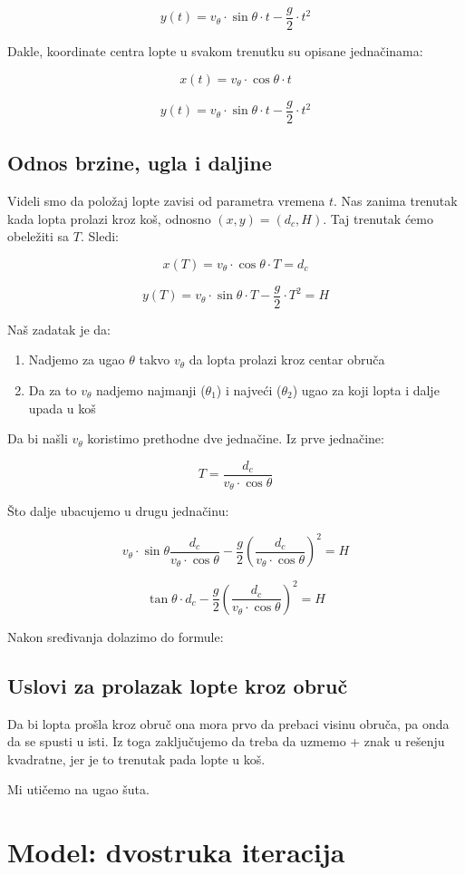 \documentclass[a4paper, 12pt]{article}
\begin{document}
\[y(t) = v_{\theta} \cdot \sin \theta\cdot t - \dfrac{g}{2} \cdot t^2\]

Dakle, koordinate centra lopte u svakom trenutku su opisane jednačinama:

\[x(t) = v_\theta \cdot \cos \theta \cdot t\]

\[y(t) = v_{\theta} \cdot \sin \theta \cdot t - \dfrac{g}{2} \cdot t^2\]

\subsection{Odnos brzine, ugla i daljine}

Videli smo da položaj lopte zavisi od parametra vremena $t$. Nas zanima trenutak kada lopta prolazi kroz koš, odnosno $(x,y) = (d_c,H)$. Taj trenutak ćemo obeležiti sa $T$. Sledi:

\[x(T) = v_\theta \cdot \cos \theta \cdot T = d_c\]

\[y(T) = v_{\theta} \cdot \sin \theta \cdot T - \dfrac{g}{2} \cdot T^2 = H\]

\pagebreak

Naš zadatak je da:

\begin{enumerate}
\item Nadjemo za ugao $\theta$ takvo $v_{\theta}$ da lopta prolazi kroz centar obruča
\item Da za to $v_{\theta}$ nadjemo najmanji ($\theta_1$) i najveći ($\theta_2$) ugao za koji lopta i dalje upada u koš
\end{enumerate}

Da bi našli $v_{\theta}$ koristimo prethodne dve jednačine. Iz prve jednačine:

\[T = \dfrac{d_c}{v_\theta \cdot \cos \theta} \]

Što dalje ubacujemo u drugu jednačinu:

\[v_{\theta} \cdot \sin \theta \dfrac{d_c}{v_\theta \cdot \cos \theta} - \dfrac{g}{2} (\dfrac{d_c}{v_\theta \cdot \cos \theta})^2 = H\]

\[\tan \theta \cdot d_c - \dfrac{g}{2} (\dfrac{d_c}{v_\theta \cdot \cos \theta})^2 = H\]

Nakon sređivanja dolazimo do formule:



\subsection{Uslovi za prolazak lopte kroz obruč}

Da bi lopta prošla kroz obruč ona mora prvo da prebaci visinu obruča, pa onda da se spusti u isti. Iz toga zaključujemo da treba da uzmemo + znak u rešenju kvadratne, jer je to trenutak pada lopte u koš.

Mi utičemo na ugao šuta.

\section{Model: dvostruka iteracija}
\end{document}
